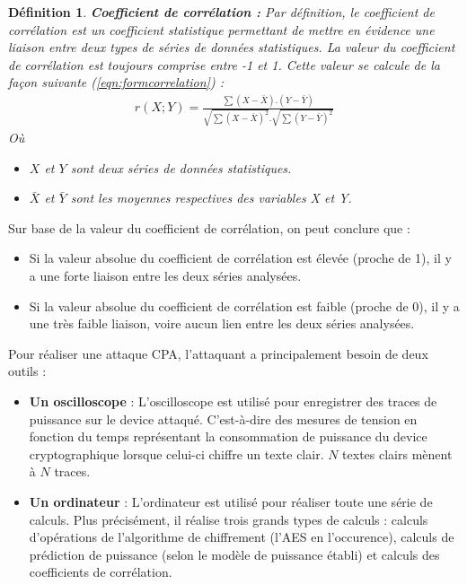 \documentclass[oneside]{book}
\newtheorem{definition}{Définition}[section]
\begin{document}
\theoremstyle{definition}
\begin{definition}{\textbf{Coefficient de corrélation :}}
Par définition, le coefficient de corrélation est un coefficient statistique permettant de mettre en évidence une liaison entre deux types de séries de données statistiques. La valeur du coefficient de corrélation est toujours comprise entre -1 et 1. Cette valeur se calcule de la façon suivante (\ref{eqn:formcorrelation}) :
\begin{gather}
	r(X;Y) = \frac{\sum(X-\bar{X}).(Y-\bar{Y}) }{\sqrt{\sum(X-\bar{X})^2}.\sqrt{\sum(Y-\bar{Y})^2}}\label{eqn:formcorrelation}
\end{gather}
Où 
\begin{itemize}
\item $X$ et $Y$ sont deux séries de données statistiques.
\item $\bar{X}$ et $\bar{Y}$ sont les moyennes respectives des variables X et Y.\vspace{0.4 cm}
\end{itemize}
\end{definition}

\vspace{-0.4cm}\hspace{-0.5 cm}Sur base de la valeur du coefficient de corrélation, on peut conclure que :
\begin{itemize}
\item Si la valeur absolue du coefficient de corrélation est élevée (proche de 1), il y a une forte liaison entre les deux séries analysées.
\item Si la valeur absolue du coefficient de corrélation est faible (proche de 0), il y a une très faible liaison, voire aucun lien entre les deux séries analysées.
\end{itemize}

\hspace{-0.5 cm}Pour réaliser une attaque CPA, l'attaquant a principalement besoin de deux outils :
\begin{itemize}
\item \textbf{Un oscilloscope} : L'oscilloscope est utilisé pour enregistrer des traces de puissance sur le device attaqué. C'est-à-dire des mesures de tension en fonction du temps représentant la consommation de puissance du device cryptographique lorsque celui-ci chiffre un texte clair. $N$ textes clairs mènent à $N$ traces.
\item \textbf{Un ordinateur} : L'ordinateur est utilisé pour réaliser toute une série de calculs. Plus précisément, il réalise trois grands types de calculs : calculs d'opérations de l'algorithme de chiffrement (l'AES en l'occurence), calculs de prédiction de puissance (selon le modèle de puissance établi) et calculs des coefficients de corrélation. \\
\end{itemize}
\end{document}
